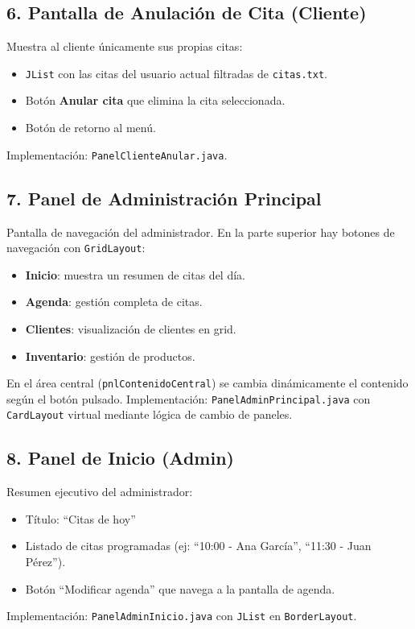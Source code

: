 \documentclass[12pt,a4paper]{report}
\begin{document}
\subsection{6. Pantalla de Anulación de Cita (Cliente)}
Muestra al cliente únicamente sus propias citas:
\begin{itemize}
    \item \texttt{JList} con las citas del usuario actual filtradas de \texttt{citas.txt}.
    \item Botón \textbf{Anular cita} que elimina la cita seleccionada.
    \item Botón de retorno al menú.
\end{itemize}
Implementación: \texttt{PanelClienteAnular.java}.

\subsection{7. Panel de Administración Principal}
Pantalla de navegación del administrador. En la parte superior hay botones de navegación con \texttt{GridLayout}:
\begin{itemize}
    \item \textbf{Inicio}: muestra un resumen de citas del día.
    \item \textbf{Agenda}: gestión completa de citas.
    \item \textbf{Clientes}: visualización de clientes en grid.
    \item \textbf{Inventario}: gestión de productos.
\end{itemize}
En el área central (\texttt{pnlContenidoCentral}) se cambia dinámicamente el contenido según el botón pulsado. Implementación: \texttt{PanelAdminPrincipal.java} con \texttt{CardLayout} virtual mediante lógica de cambio de paneles.

\subsection{8. Panel de Inicio (Admin)}
Resumen ejecutivo del administrador:
\begin{itemize}
    \item Título: ``Citas de hoy''
    \item Listado de citas programadas (ej: ``10:00 - Ana García'', ``11:30 - Juan Pérez'').
    \item Botón ``Modificar agenda'' que navega a la pantalla de agenda.
\end{itemize}
Implementación: \texttt{PanelAdminInicio.java} con \texttt{JList} en \texttt{BorderLayout}.
\end{document}
